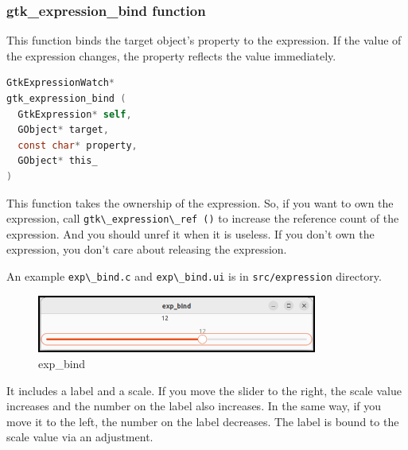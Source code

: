 \subsubsection{gtk\_expression\_bind
function}\label{gtk_expression_bind-function}

This function binds the target object's property to the expression. If
the value of the expression changes, the property reflects the value
immediately.

\begin{lstlisting}[language=C]
GtkExpressionWatch*
gtk_expression_bind (
  GtkExpression* self,
  GObject* target,
  const char* property,
  GObject* this_
)
\end{lstlisting}

This function takes the ownership of the expression. So, if you want to
own the expression, call
\passthrough{\lstinline!gtk\_expression\_ref ()!} to increase the
reference count of the expression. And you should unref it when it is
useless. If you don't own the expression, you don't care about releasing
the expression.

An example \passthrough{\lstinline!exp\_bind.c!} and
\passthrough{\lstinline!exp\_bind.ui!} is in
\passthrough{\lstinline!src/expression!} directory.

\begin{figure}
\centering
\includegraphics[width=9.2cm,height=1.9cm]{../image/exp_bind.png}
\caption{exp\_bind}
\end{figure}

It includes a label and a scale. If you move the slider to the right,
the scale value increases and the number on the label also increases. In
the same way, if you move it to the left, the number on the label
decreases. The label is bound to the scale value via an adjustment.

